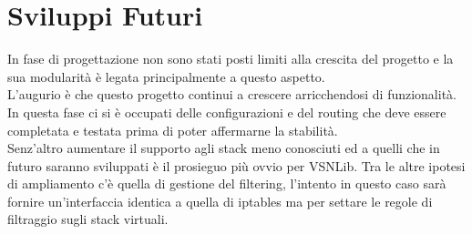 
\chapter*{Sviluppi Futuri}
In fase di progettazione non sono stati posti limiti alla crescita del progetto e la sua modularit\`a \`e legata principalmente a questo aspetto.\\
L'augurio \`e che questo progetto continui a crescere arricchendosi di funzionalit\`a.\\
In questa fase ci si \`e occupati delle configurazioni e del routing che deve essere completata e testata prima di poter affermarne la stabilit\`a.\\
Senz'altro aumentare il supporto agli stack meno conosciuti ed a quelli che in futuro saranno sviluppati \`e il prosieguo pi\`u ovvio per VSNLib.
Tra le altre ipotesi di ampliamento c'\`e quella di gestione del filtering, l'intento in questo caso sar\`a fornire un'interfaccia identica a quella di iptables ma per settare le regole di filtraggio sugli stack virtuali.\\
